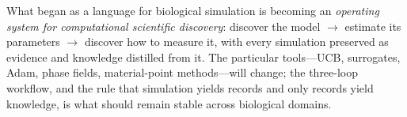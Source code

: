 \documentclass[11pt]{article}
\begin{document}
What began as a language for biological simulation is becoming an \emph{operating system for computational scientific discovery}: discover the model $\to$ estimate its parameters $\to$ discover how to measure it, with every simulation preserved as evidence and knowledge distilled from it. The particular tools---UCB, surrogates, Adam, phase fields, material-point methods---will change; the three-loop workflow, and the rule that simulation yields records and only records yield knowledge, is what should remain stable across biological domains.
\end{document}
